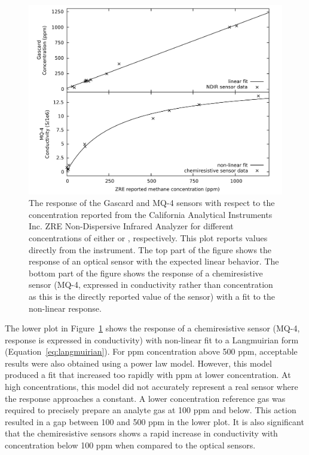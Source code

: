 \documentclass[sensors,article,submit,moreauthors,pdftex]{Definitions/mdpi}
\begin{document}
			\begin{figure}[!t]
				\centering
				\includegraphics[width=0.9\columnwidth]{honey9.pdf}
				\caption{%
					The response of the Gascard and MQ-4 sensors with respect to the concentration reported from the California Analytical Instruments Inc. ZRE Non-Dispersive Infrared Analyzer for different concentrations of either  or , respectively.
					This plot reports values directly from the instrument.
					The top part of the figure shows the response of an optical  sensor with the expected linear behavior.
					The bottom part of the figure shows the response of a chemiresistive  sensor (MQ-4, expressed in conductivity rather than concentration as this is the directly reported value of the sensor) with a fit to the non-linear response.
				}
				\label{fig:gascardcodiff}
			\end{figure}
			
			The lower plot in Figure~\ref{fig:gascardcodiff} shows the response of a chemiresistive  sensor (MQ-4, response is expressed in conductivity) with non-linear fit to a  Langmuirian form (Equation~\ref{eq:langmuirian}).
			For ppm concentration above 500 ppm, acceptable results were also obtained using a power law model.
			However, this model produced a fit that increased too rapidly with ppm at lower concentration.
			At high concentrations, this model did not accurately represent a real sensor where the response approaches a constant.
			A lower concentration reference gas was required to precisely prepare an analyte gas at 100 ppm and below.
			This action resulted in a gap between 100 and 500 ppm in the lower plot.
			It is also significant that the chemiresistive sensors shows a rapid increase in conductivity with concentration below 100 ppm when compared to the optical sensors.
			
\end{document}

